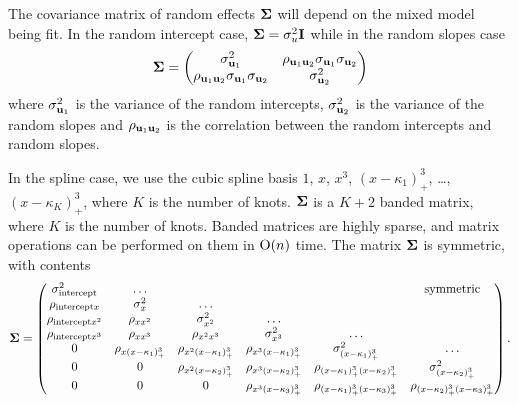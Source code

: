 The covariance matrix of random effects ${\boldsymbol \Sigma}$ will depend on the mixed model being fit. In the random
intercept case, ${\boldsymbol \Sigma} = \sigma_u^2 {\bf I}$ while in the random slopes case
\[
	{\boldsymbol \Sigma} = 
	\begin{pmatrix}
		\sigma_{{\bf u}_1}^2                                 & \rho_{{\bf u}_1 {\bf u}_2} \sigma_{{\bf u}_1} \sigma_{{\bf u}_2} \\
		\rho_{{\bf u}_1 {\bf u}_2} \sigma_{{\bf u}_1} \sigma_{{\bf u}_2} & \sigma_{{\bf u}_2}^2                                 
	\end{pmatrix}
\]
where $\sigma_{{\bf u}_1}^2$ is the variance of the random intercepts, $\sigma_{{\bf u}_2}^2$ is the variance of the
random slopes and $\rho_{{\bf u}_1 {\bf u}_2}$ is the correlation between the random intercepts and random slopes.


In the spline case, we use the cubic spline basis $1$, $x$, $x^3$, $(x - \kappa_1)^3_+$, \ldots, $(x -
\kappa_K)^3_+$, where $K$ is the number of knots. ${\boldsymbol \Sigma}$ is a $K + 2$ banded matrix, where $K$ is the
number of knots. Banded matrices are highly sparse, and matrix operations can be performed on them in
$\text{O}(n)$ time. The matrix ${\boldsymbol \Sigma}$ is symmetric, with contents
\[
	{\boldsymbol \Sigma} =
	\begin{pmatrix}
		\sigma^2_{\text{intercept}} & \ldots                      &                             &                               &                                          & \text{symmetric}              \\
		\rho_{\text{intercept} x} & \sigma^2_x & \ldots\\
		\rho_{\text{intercept} x^2} & \rho_{x x^2} & \sigma^2_{x^2} & \ldots \\
		\rho_{\text{intercept} x^3} & \rho_{x x^3} & \rho_{x^2 x^3} & \sigma^2_{x^3} & \ldots \\
		0                           & \rho_{x (x - \kappa_1)^3_+} & \rho_{x^2 (x-\kappa_1)_+^3} & \rho_{x^3 (x - \kappa_1)_+^3} & \sigma^2_{(x - \kappa_1)_+^3}            & \ldots                        \\
		0                           & 0                           & \rho_{x^2 (x-\kappa_2)_+^3} & \rho_{x^3 (x-\kappa_2)_+^3}   & \rho_{(x-\kappa_1)_+^3 (x-\kappa_2)_+^3} & \sigma^2_{(x - \kappa_2)_+^3} \\
		0 & 0 & 0 & \rho_{x^3 (x - \kappa_3)_+^3} & \rho_{(x - \kappa_1)_+^3 (x - \kappa_3)_+^3} & \rho_{(x - \kappa_2)_+^3 (x - \kappa_3)_+^3}
	\end{pmatrix}.
\]

